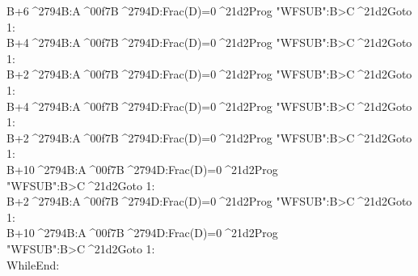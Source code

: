 \documentclass[11pt,letterpaper]{article}
\newcommand{\STO}{{\large ^^^^2794}}
\newcommand{\CBR}{{\Large ^^^^21d2}}
\newcommand{\DIV}{^^^^00f7}
\newcommand{\IDENT}[1]{\hspace*{#1\BaseIndent}}
\begin{document}
\begin{linenumbers}
\IDENT{1}B+6\STO B:A\DIV B\STO D:Frac(D)=0\CBR Prog "WFSUB":B>C\CBR Goto 1:\\
\IDENT{1}B+4\STO B:A\DIV B\STO D:Frac(D)=0\CBR Prog "WFSUB":B>C\CBR Goto 1:\\
\IDENT{1}B+2\STO B:A\DIV B\STO D:Frac(D)=0\CBR Prog "WFSUB":B>C\CBR Goto 1:\\
\IDENT{1}B+4\STO B:A\DIV B\STO D:Frac(D)=0\CBR Prog "WFSUB":B>C\CBR Goto 1:\\
\IDENT{1}B+2\STO B:A\DIV B\STO D:Frac(D)=0\CBR Prog "WFSUB":B>C\CBR Goto 1:\\
\IDENT{1}B+10\STO B:A\DIV B\STO D:Frac(D)=0\CBR Prog "WFSUB":B>C\CBR Goto 1:\\
\IDENT{1}B+2\STO B:A\DIV B\STO D:Frac(D)=0\CBR Prog "WFSUB":B>C\CBR Goto 1:\\
\IDENT{1}B+10\STO B:A\DIV B\STO D:Frac(D)=0\CBR Prog "WFSUB":B>C\CBR Goto 1:\\
WhileEnd:
\end{linenumbers}
\end{document}
